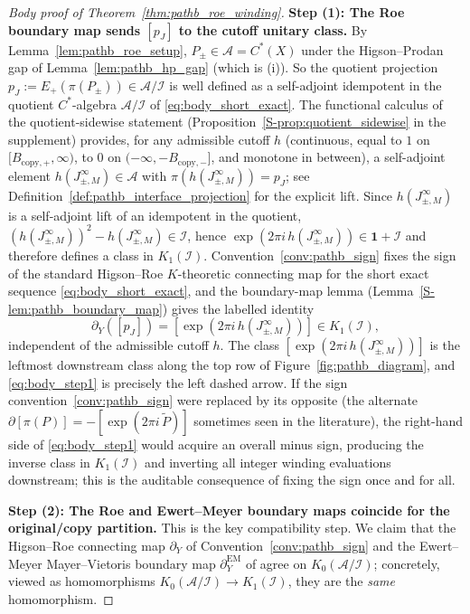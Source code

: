 \documentclass[11pt]{article}
\numberwithin{equation}{section}
\theoremstyle{definition}
\theoremstyle{remark}
\newcommand{\Id}{\mathbf{1}}
\begin{document}
\begin{proof}[Body proof of Theorem~\ref{thm:pathb_roe_winding}]
\medskip\noindent\textbf{Step (1): The Roe boundary map sends \([p_J]\) to the cutoff unitary
class.}
By Lemma~\ref{lem:pathb_roe_setup}, \(P_\pm\in\mathcal A=C^*(X)\) under the Higson--Prodan gap of
Lemma~\ref{lem:pathb_hp_gap} (which is (i)). So the quotient projection
\(p_J:=E_+(\pi(P_\pm))\in\mathcal A/\mathcal I\) is well defined as a self-adjoint idempotent in
the quotient \(C^*\)-algebra \(\mathcal A/\mathcal I\) of \eqref{eq:body_short_exact}. The
functional calculus of the quotient-sidewise statement
(Proposition~\ref{S-prop:quotient_sidewise} in the supplement) provides, for any admissible
cutoff \(h\) (continuous, equal to \(1\) on \([B_{\mathrm{copy},+},\infty)\), to \(0\) on
\((-\infty,-B_{\mathrm{copy},-}]\), and monotone in between), a self-adjoint element
\(h(J_{\pm,M}^\infty)\in\mathcal A\) with \(\pi(h(J_{\pm,M}^\infty))=p_J\); see
Definition~\ref{def:pathb_interface_projection} for the explicit lift. Since
\(h(J_{\pm,M}^\infty)\) is a self-adjoint lift of an idempotent in the quotient,
\((h(J_{\pm,M}^\infty))^2-h(J_{\pm,M}^\infty)\in\mathcal I\), hence
\(\exp(2\pi i\,h(J_{\pm,M}^\infty))\in\Id+\mathcal I\) and therefore defines a class in
\(K_1(\mathcal I)\). Convention~\ref{conv:pathb_sign} fixes the sign of the standard
Higson--Roe \(K\)-theoretic connecting map for the short exact sequence
\eqref{eq:body_short_exact}, and the boundary-map lemma
(Lemma~\ref{S-lem:pathb_boundary_map}) gives the labelled identity
\begin{equation}\label{eq:body_step1}
\partial_Y([p_J])=[\exp(2\pi i\,h(J_{\pm,M}^\infty))]\in K_1(\mathcal I),
\end{equation}
independent of the admissible cutoff \(h\). The class \([\exp(2\pi i\,h(J_{\pm,M}^\infty))]\)
is the leftmost downstream class along the top row of Figure~\ref{fig:pathb_diagram}, and
\eqref{eq:body_step1} is precisely the left dashed arrow.
If the sign convention~\ref{conv:pathb_sign} were replaced by its opposite (the alternate
\(\partial[\pi(P)]=-[\exp(2\pi i\,\tilde P)]\) sometimes seen in the literature), the
right-hand side of \eqref{eq:body_step1} would acquire an overall minus sign, producing the
inverse class in \(K_1(\mathcal I)\) and inverting all integer winding evaluations downstream;
this is the auditable consequence of fixing the sign once and for all.

\medskip\noindent\textbf{Step (2): The Roe and Ewert--Meyer boundary maps coincide for the
original/copy partition.}
This is the key compatibility step. We claim that the Higson--Roe connecting map \(\partial_Y\)
of Convention~\ref{conv:pathb_sign} and the Ewert--Meyer Mayer--Vietoris boundary map
\(\partial^{\mathrm{EM}}_Y\) of \cite{EwertMeyer2019} agree on
\(K_0(\mathcal A/\mathcal I)\); concretely, viewed as homomorphisms
\(K_0(\mathcal A/\mathcal I)\to K_1(\mathcal I)\), they are the \emph{same} homomorphism.


\end{proof}
\end{document}
